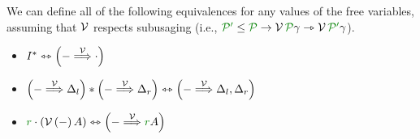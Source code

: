 \begin{lemma}\label{thm:construct-env}
  We can define all of the following equivalences for any values of the free
  variables, assuming that $\mathcal V$ respects subusaging (i.e.,
  $\grPprime \leq \grP \to
  \V\,\grP\gamma \rightarrowtriangle \V\,\grPprime\gamma$).
  \begin{itemize}
    \item $I^{\sep} \leftrightarrowtriangle \plr{{-} \env\V {\cdot}}$
    \item $\plr{{-} \env\V \Delta_l} \sep \plr{{-} \env\V \Delta_r}
      \leftrightarrowtriangle \plr{{-} \env\V \Delta_l, \Delta_r}$
    \item $\gr r \cdot \plr{\V\,(-)\,A}
      \leftrightarrowtriangle \plr{{-} \env\V \gr rA}$
  \end{itemize}
\end{lemma}
